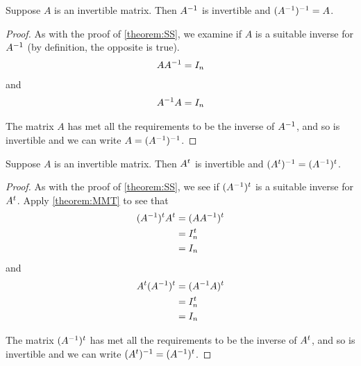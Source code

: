 \documentclass{ximera}
\begin{document}
\begin{theorem}
  \label{theorem:MIMI}

  Suppose $A$ is an invertible matrix.  Then $A^{-1}$ is invertible and $(A^{-1})^{-1}=A$.

  \begin{proof}
    As with the proof of \ref{theorem:SS}, we examine if $A$ is a suitable inverse for $A^{-1}$ (by definition, the opposite is true).
    \begin{align*}
      A\inverse{A}&=I_n\\ %
      \end{align*}
      and
      \begin{align*}
        \inverse{A}A&=I_n\\ %
      \end{align*}

    The matrix $A$ has met all the requirements to be the inverse of $A^{-1}$, and so is invertible and we can write $A=(A^{-1})^{-1}$.

  \end{proof}
\end{theorem}

\begin{theorem}
  \label{theorem:MIT}

  Suppose $A$ is an invertible matrix.  Then $A^{t}$ is invertible and $(A^{t})^{-1}=(A^{-1})^{t}$.

  \begin{proof}
    As with the proof of \ref{theorem:SS}, we see if $(A^{-1})^{t}$ is a suitable inverse for $A^{t}$. Apply \ref{theorem:MMT} to see that
    \begin{align*}
      \transpose{(\inverse{A})}\transpose{A}
      &=\transpose{(A\inverse{A})}\\ %
      &=\transpose{I_n}\\ %
      &=I_n\\ %
      \end{align*}
      and
      \begin{align*}
        \transpose{A}\transpose{(\inverse{A})}
      &=\transpose{(\inverse{A}A)}\\ %
      &=\transpose{I_n}\\ %
      &=I_n\\ %
    \end{align*}

    The matrix $(A^{-1})^{t}$ has met all the
    requirements to be the inverse of $A^{t}$, and so is
    invertible and we can write
    $(A^{t})^{-1}=(A^{-1})^{t}$.

\end{proof}
\end{theorem}
\end{document}
